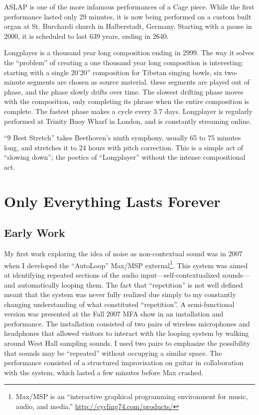 \documentclass{thesis}
\begin{document}
ASLAP is one of the more infamous performances of a Cage piece. While the first performance lasted only 29 minutes, it is now being performed on a custom built organ at St. Burchardi church in Halberstadt, Germany. Starting with a pause in 2000, it is scheduled to last 639 years, ending in 2640.
	
Longplayer is a thousand year long composition ending in 2999. The way it solves the ``problem'' of creating a one thousand year long composition is interesting: starting with a single 20'20'' composition for Tibetan singing bowls, six two-minute segments are chosen as source material. these segments are played out of phase, and the phase slowly drifts over time. The slowest drifting phase moves with the composition, only completing its phrase when the entire composition is complete. The fastest phase makes a cycle every 3.7 days. Longplayer is regularly performed at Trinity Buoy Wharf in London, and is constantly streaming online.

``9 Beet Stretch'' takes Beethoven's ninth symphony, usually 65 to 75 minutes long, and stretches it to 24 hours with pitch correction. This is a simple act of ``slowing down''; the poetics of ``Longplayer'' without the intense compositional act.
				
\chapter{Only Everything Lasts Forever}

\section{Early Work}

My first work exploring the idea of noise as non-contextual sound was in 2007 when I developed the ``AutoLoop'' Max/MSP external\footnote{Max/MSP is an ``interactive graphical programming environment for music, audio, and media.'' \url{http://cycling74.com/products/}}. This system was aimed at identifying repeated sections of the audio input---self-contextualized sounds---and automatically looping them. The fact that ``repetition'' is not well defined meant that the system was never fully realized due simply to my constantly changing understanding of what constituted ``repetition''. A semi-functional version was presented at the Fall 2007 MFA show in an installation and performance. The installation consisted of two pairs of wireless microphones and headphones that allowed visitors to interact with the looping system by walking around West Hall sampling sounds. I used two pairs to emphasize the possibility that sounds may be ``repeated'' without occupying a similar space. The performance consisted of a structured improvisation on guitar in collaboration with the system, which lasted a few minutes before Max crashed.
\end{document}

